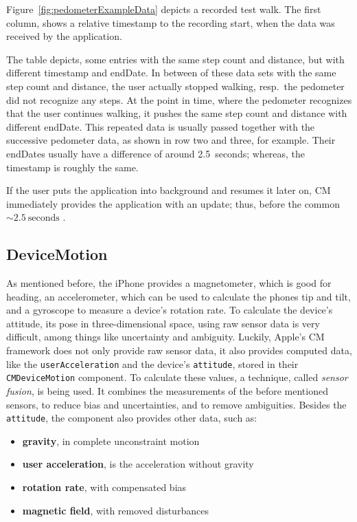 Figure~\ref{fig:pedometerExampleData} depicts a recorded test walk. The first column, shows a relative timestamp to the recording start, when the data was received by the application.

The table depicts, some entries with the same step count and distance, but with different timestamp and endDate. In between of these data sets with the same step count and distance, the user actually stopped walking, resp.\ the pedometer did not recognize any steps. At the point in time, where the pedometer recognizes that the user continues walking, it pushes the same step count and distance with different endDate. This repeated data is usually passed together with the successive pedometer data, as shown in row two and three, for example. Their endDates usually have a difference of around 2.5~seconds; whereas, the timestamp is roughly the same.

If the user puts the application into background and resumes it later on, \ac{CM} immediately provides the application with an update; thus, before the common $\sim 2.5~\text{seconds}$ \citep{apple:wwdc_2014_pham}.


\subsection{DeviceMotion}
As mentioned before, the iPhone provides a magnetometer, which is good for heading, an accelerometer, which can be used to calculate the phones tip and tilt, and a gyroscope to measure a device's rotation rate. To calculate the device's attitude, its pose in three-dimensional space, using raw sensor data is very difficult, among things like uncertainty and ambiguity. Luckily, Apple's \ac{CM} framework does not only provide raw sensor data, it also provides computed data, like the \texttt{userAcceleration} and the device's \texttt{attitude}, stored in their \texttt{CMDeviceMotion} component. To calculate these values, a technique, called \emph{sensor fusion}, is being used. It combines the measurements of the before mentioned sensors, to reduce bias and uncertainties, and to remove ambiguities. Besides the \texttt{attitude}, the component also provides other data, such as:
\begin{itemize}
  \item \textbf{gravity}, in complete unconstraint motion
  \item \textbf{user acceleration}, is the acceleration without gravity
  \item \textbf{rotation rate}, with compensated bias
  \item \textbf{magnetic field}, with removed disturbances
\end{itemize}

